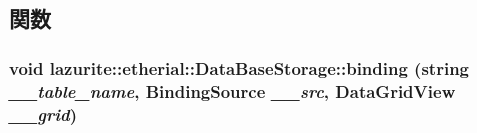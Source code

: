 \subsection{関数}
\hypertarget{classlazurite_1_1etherial_1_1_data_base_storage_a5aa77ecd6cb359e04cd2c12a06827516}{
\subsubsection[{binding}]{\setlength{\rightskip}{0pt plus 5cm}void lazurite::etherial::DataBaseStorage::binding (string {\em \_\-\_\-table\_\-name}, \/  BindingSource {\em \_\-\_\-src}, \/  DataGridView {\em \_\-\_\-grid})}}
\label{classlazurite_1_1etherial_1_1_data_base_storage_a5aa77ecd6cb359e04cd2c12a06827516}

